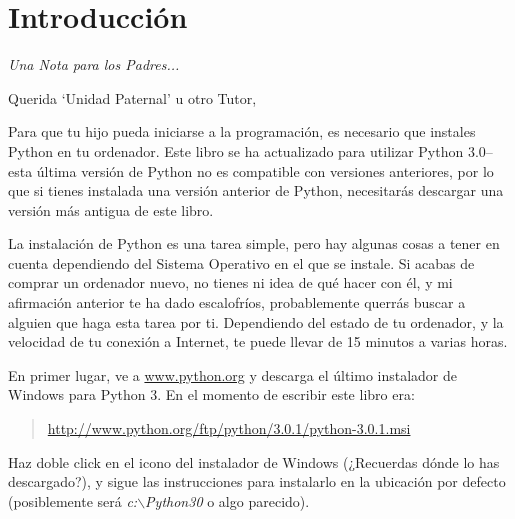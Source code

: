 

\chapter*{Introducción}\normalsize
\begin{center}
{\em Una Nota para los Padres...}
\end{center}
\pagestyle{plain}

\noindent
Querida `Unidad Paternal' u otro Tutor,

Para que tu hijo pueda iniciarse a la programación, es necesario que instales Python en tu ordenador. Este libro se ha actualizado para utilizar Python 3.0--esta última versión de Python no es compatible con versiones anteriores, por lo que si tienes instalada una versión anterior de Python, necesitarás descargar una versión más antigua de este libro.

La instalación de Python es una tarea simple, pero hay algunas cosas a tener en cuenta dependiendo del Sistema Operativo en el que se instale. Si acabas de comprar un ordenador nuevo, no tienes ni idea de qué hacer con él, y mi afirmación anterior te ha dado escalofríos, probablemente querrás buscar a alguien que haga esta tarea por ti. Dependiendo del estado de tu ordenador, y la velocidad de tu conexión a Internet, te puede llevar de 15 minutos a varias horas.

\begin{WINDOWS}

\noindent
En primer lugar, ve a  \href{http://www.python.org}{www.python.org} y descarga el último instalador de Windows para Python 3.  En el momento de escribir este libro era:
\begin{quote}
     \href{http://www.python.org/ftp/python/3.0.1/python-3.0.1.msi}{http://www.python.org/ftp/python/3.0.1/python-3.0.1.msi}
\end{quote}
Haz doble click en el icono del instalador de Windows (¿Recuerdas dónde lo has descargado?), y sigue las instrucciones para instalarlo en la ubicación por defecto (posiblemente será \emph{c:$\backslash$Python30} o algo parecido).

\end{WINDOWS}

